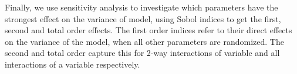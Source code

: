 Finally, we use sensitivity analysis to investigate which parameters have the
strongest effect on the variance of model, using Sobol indices to get the
first, second and total order effects. The first order indices refer to their
direct effects on the variance of the model, when all other parameters are
randomized. The second and total order capture this for 2-way interactions of
variable and all interactions of a variable respectively.

